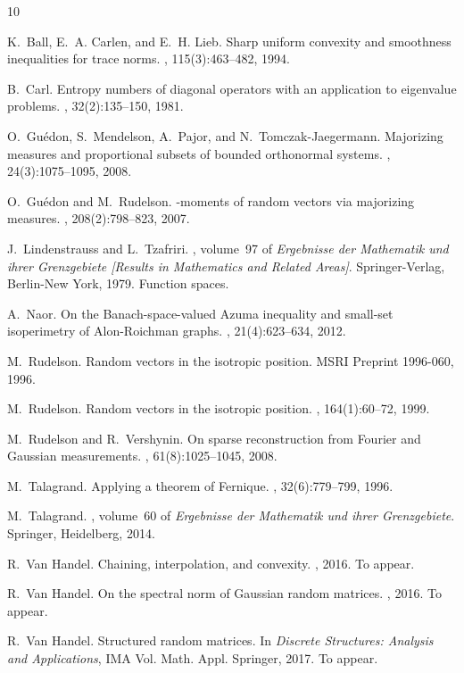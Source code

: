 \documentclass[10pt,reqno]{amsart}
\theoremstyle{definition}
\numberwithin{equation}{section}
\numberwithin{figure}{section}
\numberwithin{table}{section}
\begin{document}
\begin{thebibliography}{10}

K.~Ball, E.~A. Carlen, and E.~H. Lieb.
\newblock Sharp uniform convexity and smoothness inequalities for trace norms.
, 115(3):463--482, 1994.

B.~Carl.
\newblock Entropy numbers of diagonal operators with an application to
  eigenvalue problems.
, 32(2):135--150, 1981.

O.~Gu{\'e}don, S.~Mendelson, A.~Pajor, and N.~Tomczak-Jaegermann.
\newblock Majorizing measures and proportional subsets of bounded orthonormal
  systems.
, 24(3):1075--1095, 2008.

O.~Gu{\'e}don and M.~Rudelson.
-moments of random vectors via majorizing measures.
, 208(2):798--823, 2007.

J.~Lindenstrauss and L.~Tzafriri.
, volume~97 of {\em Ergebnisse
  der Mathematik und ihrer Grenzgebiete [Results in Mathematics and Related
  Areas]}.
\newblock Springer-Verlag, Berlin-New York, 1979.
\newblock Function spaces.

A.~Naor.
\newblock On the {B}anach-space-valued {A}zuma inequality and small-set
  isoperimetry of {A}lon-{R}oichman graphs.
, 21(4):623--634, 2012.

M.~Rudelson.
\newblock Random vectors in the isotropic position.
\newblock MSRI Preprint 1996-060, 1996.

M.~Rudelson.
\newblock Random vectors in the isotropic position.
, 164(1):60--72, 1999.

M.~Rudelson and R.~Vershynin.
\newblock On sparse reconstruction from {F}ourier and {G}aussian measurements.
, 61(8):1025--1045, 2008.

M.~Talagrand.
\newblock Applying a theorem of {F}ernique.
, 32(6):779--799,
  1996.

M.~Talagrand.
, volume~60 of
  {\em Ergebnisse der Mathematik und ihrer Grenzgebiete}.
\newblock Springer, Heidelberg, 2014.

R.~{Van Handel}.
\newblock Chaining, interpolation, and convexity.
, 2016.
\newblock To appear.

R.~{Van Handel}.
\newblock On the spectral norm of {G}aussian random matrices.
, 2016.
\newblock To appear.

R.~{Van Handel}.
\newblock Structured random matrices.
\newblock In {\em Discrete Structures: Analysis and Applications}, IMA Vol.
  Math. Appl. Springer, 2017.
\newblock To appear.

\end{thebibliography}
\end{document}
